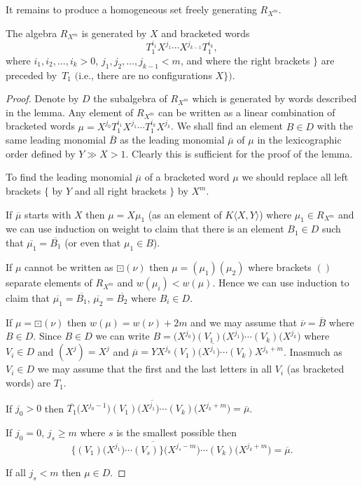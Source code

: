 It remains to produce a homogeneous set freely generating $R_{X^m}$.

\begin{Lemma}\label{homogeneous free generating set} The algebra $R_{X^m}$ is generated by $X$ and bracketed words
\[
T_1^{i_1}X^{j_1} \cdots X^{j_{k-1}}T_1^{i_k},
\]
where $i_1, i_2, \ldots, i_k > 0$, $j_1, j_2, \ldots, j_{k-1} < m$, and where the right brackets $\}$ are preceded by~$T_1$ $($i.e., there are no configurations $X\})$.
\end{Lemma}

\begin{proof}Denote by $D$ the subalgebra of $R_{X^m}$ which is generated by words described in the lemma. Any element of $R_{X^m}$ can be written as a linear combination of bracketed words $\mu = X^{j_0}T_1^{i_1}X^{j_1} \cdots T_1^{i_k}X^{j_k}$. We shall find an element $B \in D$ with the same leading monomial $\overline{B}$ as the leading monomial $\overline{\mu}$ of $\mu$ in the lexicographic order defined by $Y\gg X > 1$. Clearly this is sufficient for the proof of the lemma.

To find the leading monomial $\overline{\mu}$ of a bracketed word $\mu$ we should replace all left brackets $\{$ by $Y$ and all right brackets $\}$ by $X^m$.

If $\overline{\mu}$ starts with $X$ then $\mu = X\mu_1$ (as an element of $K\langle X,Y\rangle$) where $\mu_1 \in R_{X^m}$ and we can use induction on weight to claim that there is an element $B_1 \in D$ such that $\overline{\mu_1} = \overline{B_1}$ (or even that $\mu_1 \in B$).

If $\mu$ cannot be written as $\boxdot(\nu)$ then $\mu = (\mu_1)(\mu_2)$ where brackets $()$ separate elements of $R_{X^m}$ and $w(\mu_i) < w(\mu)$. Hence we can use induction to claim that $\overline{\mu_1} = \overline{B_1}$, $\overline{\mu_2} = \overline{B_2}$ where $B_i \in D$.

If $\mu = \boxdot(\nu)$ then $w(\mu) = w(\nu) + 2m$ and we may assume that $\overline{\nu} = \overline{B}$ where $B \in D$. Since $B \in D$ we can write $B = \big(X^{j_0}\big)(V_1)\big(X^{j_1}\big)\cdots (V_k)\big(X^{j_k}\big)$ where $V_i \in D$ and $(X^j) = X^j$ and $\overline{\mu} = YX^{j_0}\overline{(V_1)\big(X^{j_1}\big)\cdots (V_k)}X^{j_k + m}$. Inasmuch as $V_i \in D$ we may assume that the first and the last letters in all $V_i$ (as bracketed words) are $T_1$.

If $j_0 > 0$ then $\overline{T_1}\big(X^{j_0-1}\big)\overline{(V_1)\big(X^{j_1}\big)\cdots (V_k)}\big(X^{j_k + m}\big) = \overline{\mu}$.

If $j_0 = 0$, $j_s \geq m$ where $s$ is the smallest possible then
\[
\overline{\big\{(V_1)\big(X^{j_1}\big)\cdots (V_s)\big\}\big(X^{j_s - m}\big)\cdots (V_k)}\big(X^{j_k + m}\big) = \overline{\mu}.
\]

If all $j_s < m$ then $\mu \in D$.
\end{proof}

